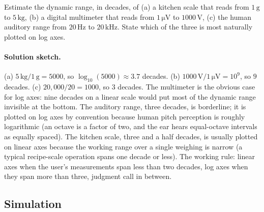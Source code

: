 \begin{exercise}
Estimate the dynamic range, in decades, of (a) a kitchen scale that
reads from $1 \,\si{\gram}$ to $5 \,\si{\kilogram}$, (b) a digital
multimeter that reads from $1 \,\si{\micro\volt}$ to $1000 \,\si
{\volt}$, (c) the human auditory range from $20 \,\si{\hertz}$ to
$20 \,\si{\kilo\hertz}$. State which of the three is most naturally
plotted on log axes.

\paragraph{Solution sketch.}
(a) $5\,\si{\kilo\gram}/1\,\si{\gram} = 5000$, so $\log_{10}(5000)
\approx 3.7$ decades.
(b) $1000\,\si{\volt}/1\,\si{\micro\volt} = 10^{9}$, so $9$
decades.
(c) $20{,}000/20 = 1000$, so $3$ decades.
The multimeter is the obvious case for log axes: nine decades on a
linear scale would put most of the dynamic range invisible at the
bottom. The auditory range, three decades, is borderline; it is
plotted on log axes by convention because human pitch perception
is roughly logarithmic (an octave is a factor of two, and the ear
hears equal-octave intervals as equally spaced). The kitchen scale,
three and a half decades, is usually plotted on linear axes
because the working range over a single weighing is narrow (a
typical recipe-scale operation spans one decade or less). The
working rule: linear axes when the user's measurements span less
than two decades, log axes when they span more than three, judgment
call in between.
\end{exercise}

\subsection*{Simulation}

